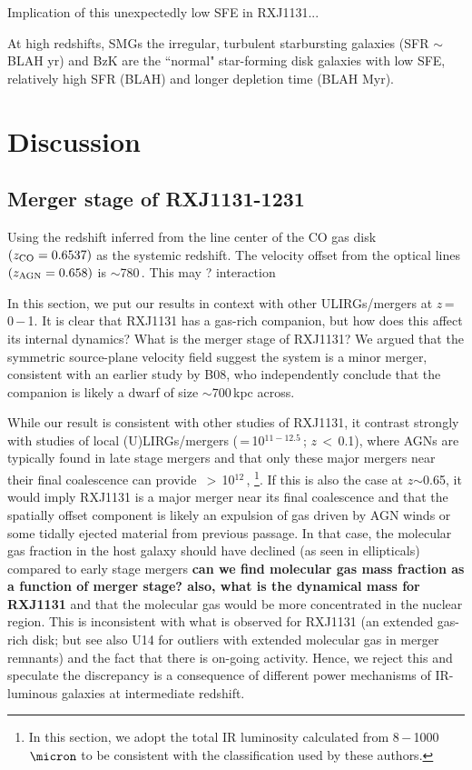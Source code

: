 \documentclass[]{emulateapj}
\begin{document}
Implication of this unexpectedly low SFE in RXJ1131...

At high redshifts, SMGs the irregular, turbulent starbursting galaxies (SFR $\sim$ BLAH \Msun yr\pmOne)
and BzK are the ``normal" star-forming disk galaxies with low SFE, relatively high SFR (BLAH) and 
longer depletion time (BLAH Myr). 

\section{Discussion} \label{sec:diss}
\subsection{Merger stage of RXJ1131-1231}
Using the redshift inferred from the line center of the CO gas disk $(z_{\rm CO} = 0.6537)$ 
as the systemic redshift. The velocity offset from the optical lines $(z_{\rm AGN} = 0.658)$ 
is $\sim$780\,\kms. This may ? interaction

In this section, we put our results in context with other ULIRGs/mergers at
$z$\,=\,0\,$-$\,1. It is clear that RXJ1131 has a
gas-rich companion, but how does this affect its internal dynamics?
What is the merger stage of RXJ1131?
We argued that the symmetric source-plane velocity field suggest
the system is a minor merger, consistent with an earlier study by B08, who
independently conclude that the companion is likely
a dwarf of size $\sim$700\,kpc across.

While our result is consistent with other studies of RXJ1131, it
contrast strongly with studies of local (U)LIRGs/mergers
(\LIR\,=\,10$^{11-12.5}$\,\Lsun; $z$\,$<$\,0.1), where AGNs are
typically found in late stage mergers
\citep{Yuan10a,Iwasawa11a,Carpineti12a} and
that only these major mergers near their final
coalescence can provide \LIR\,$>$\,10$^{12}$\,\Lsun,
\citep[\eg][hereafter L16]{Carpineti15a,Larson16a}
\footnote{In this section, we adopt the total IR luminosity
calculated from 8\,$-$\,1000\,$\micron$
to be consistent with the classification used by these authors.}.
If this is also the case at $z$$\sim$0.65, it would imply RXJ1131
is a major merger near its final coalescence and that the spatially offset
component is likely an expulsion of gas driven by AGN winds or some
tidally ejected material from previous passage.
In that case, the molecular gas fraction in the host
galaxy should have declined (as seen in ellipticals) compared to early
stage mergers
\textbf{can we find molecular gas mass fraction as a
function of merger stage? also, what is the dynamical mass for RXJ1131}
and that the molecular gas would
be more concentrated in the nuclear region.
This is inconsistent with what
is observed for RXJ1131
(an extended gas-rich disk; but see also U14 for outliers
with extended molecular gas in merger remnants) and
the fact that there is on-going \SF activity.
Hence, we reject this and speculate the discrepancy is a consequence
of different power mechanisms of IR-luminous galaxies at intermediate redshift.
\end{document}
